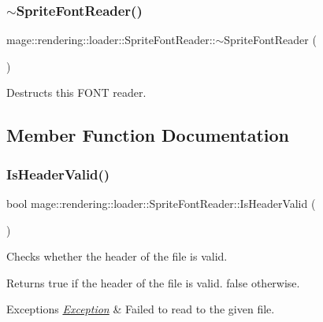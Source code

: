 \subsubsection{\texorpdfstring{$\sim$\+Sprite\+Font\+Reader()}{~SpriteFontReader()}}
{\footnotesize\ttfamily mage\+::rendering\+::loader\+::\+Sprite\+Font\+Reader\+::$\sim$\+Sprite\+Font\+Reader (\begin{DoxyParamCaption}{ }\end{DoxyParamCaption})\hspace{0.3cm}{\ttfamily [default]}}

Destructs this F\+O\+NT reader. 

\subsection{Member Function Documentation}
\mbox{\label{classmage_1_1rendering_1_1loader_1_1_sprite_font_reader_a0523d92193229bced5669791524e4ea9}} 
\subsubsection{\texorpdfstring{Is\+Header\+Valid()}{IsHeaderValid()}}
{\footnotesize\ttfamily bool mage\+::rendering\+::loader\+::\+Sprite\+Font\+Reader\+::\+Is\+Header\+Valid (\begin{DoxyParamCaption}{ }\end{DoxyParamCaption})\hspace{0.3cm}{\ttfamily [private]}}

Checks whether the header of the file is valid.

\begin{DoxyReturn}{Returns}
{\ttfamily true} if the header of the file is valid. {\ttfamily false} otherwise. 
\end{DoxyReturn}

\begin{DoxyExceptions}{Exceptions}
{\em \mbox{\hyperlink{classmage_1_1_exception}{Exception}}} & Failed to read to the given file. \\
\hline
\end{DoxyExceptions}
\mbox{\label{classmage_1_1rendering_1_1loader_1_1_sprite_font_reader_a645988b6bba2a4fda93d18c4c9e3d09c}} 

